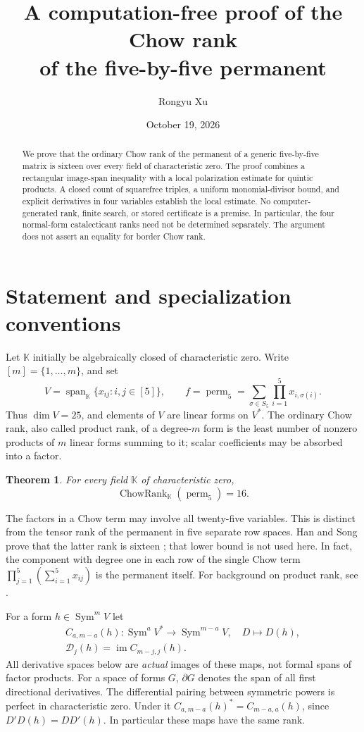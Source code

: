 \documentclass[11pt]{amsart}
\title[A computation-free proof for the five-by-five permanent]{A computation-free proof of the Chow rank\\of the five-by-five permanent}
\author{Rongyu Xu}
\date{October 19, 2026}
\newtheorem{theorem}{Theorem}[section]
\theoremstyle{remark}
\numberwithin{equation}{section}
\newcommand{\K}{\mathbb K}
\newcommand{\Sym}{\operatorname{Sym}}
\newcommand{\Span}{\operatorname{span}}
\newcommand{\im}{\operatorname{im}}
\newcommand{\perm}{\operatorname{perm}}
\newcommand{\CR}{\operatorname{ChowRank}}
\newcommand{\cD}{\mathcal D}
\newcommand{\dd}{\partial}
\begin{document}
\begin{abstract}
We prove that the ordinary Chow rank of the permanent of a generic
five-by-five matrix is sixteen over every field of characteristic zero.
The proof combines a rectangular image-span inequality with a local
polarization estimate for quintic products. A closed count of squarefree
triples, a uniform monomial-divisor bound, and explicit derivatives in
four variables establish the local estimate. No computer-generated rank,
finite search, or stored certificate is a premise. In particular, the
four normal-form catalecticant ranks need not be determined separately.
The argument does not assert an equality for border Chow rank.
\end{abstract}
\maketitle

\section{Statement and specialization conventions}
Let \(\K\) initially be algebraically closed of characteristic zero. Write
\([m]=\{1,\ldots,m\}\), and set
\[
 V=\Span_{\K}\{x_{ij}:i,j\in[5]\},\qquad
 f=\perm_5=\sum_{\sigma\in S_5}\prod_{i=1}^5x_{i,\sigma(i)}.
\]
Thus \(\dim V=25\), and elements of \(V\) are linear forms on \(V^*\).
The ordinary Chow rank, also called product rank, of a degree-\(m\) form
is the least number of nonzero products of \(m\) linear forms summing to
it; scalar coefficients may be absorbed into a factor.
\begin{theorem}\label{thm:main}
For every field \(\K\) of characteristic zero,
\[
 \CR_{\K}(\perm_5)=16.
\]
\end{theorem}
The factors in a Chow term may involve all twenty-five variables. This
is distinct from the tensor rank of the permanent in five separate row
spaces. Han and Song prove that the latter rank is sixteen
\cite{HanSong2026}; that lower bound is not used here. In fact, the
component with degree one in each row of the single Chow term
\(\prod_{j=1}^5(\sum_{i=1}^5x_{ij})\) is the permanent itself.
For background on product rank, see \cite{IltenTeitler2016}.

For a form \(h\in\Sym^mV\) let
\[
 \begin{gathered}
 C_{a,m-a}(h):\Sym^aV^*\longrightarrow\Sym^{m-a}V,
 \quad D\longmapsto D(h),\\
 \cD_j(h)=\im C_{m-j,j}(h).
 \end{gathered}
\]
All derivative spaces below are \emph{actual} images of these maps,
not formal spans of factor products. For a space of forms \(G\),
\(\dd G\) denotes the span of all first directional derivatives.
The differential pairing between symmetric powers is perfect in
characteristic zero. Under it \(C_{a,m-a}(h)^*=C_{m-a,a}(h)\), since
\(D'D(h)=DD'(h)\). In particular these maps have the same rank.
\end{document}
